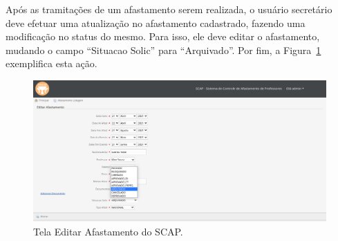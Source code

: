 Após as tramitações de um afastamento serem realizada, o usuário secretário deve efetuar uma atualização no afastamento cadastrado, fazendo uma modificação no status do mesmo. Para isso, ele deve editar o afastamento, mudando o campo ``Situacao Solic'' para ``Arquivado''. Por fim, a Figura~\ref{fig-projeto-editar-afastamento} exemplifica esta ação.

\begin{figure}[!h]
	\centering
	\includegraphics[scale=0.33]{figuras/fig-projeto-editar-afastamento} 
	\caption{Tela Editar Afastamento do SCAP.}
	\label{fig-projeto-editar-afastamento}
\end{figure}
